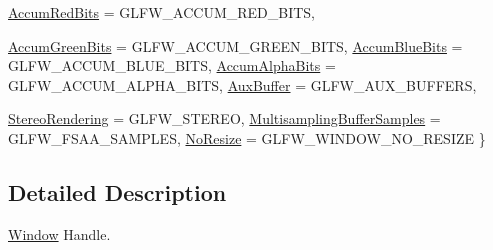 \begin{DoxyCompactItemize}
\hyperlink{namespace_f2_c_1_1_window_property_a89ec69d0a86f9d0063dfb69a3ebf3fbeafa16176fe0f3b5e528dbf1feb3d497ae}{AccumRedBits} =  GLFW\_\-ACCUM\_\-RED\_\-BITS, 
\par
\hyperlink{namespace_f2_c_1_1_window_property_a89ec69d0a86f9d0063dfb69a3ebf3fbea6e19e47f84eee541f96722fa7d0463ed}{AccumGreenBits} =  GLFW\_\-ACCUM\_\-GREEN\_\-BITS, 
\hyperlink{namespace_f2_c_1_1_window_property_a89ec69d0a86f9d0063dfb69a3ebf3fbea97b2ba20eac0c20a059383ce37f80d6b}{AccumBlueBits} =  GLFW\_\-ACCUM\_\-BLUE\_\-BITS, 
\hyperlink{namespace_f2_c_1_1_window_property_a89ec69d0a86f9d0063dfb69a3ebf3fbea8b9cf8f02ecf3600e1acbef746d18b22}{AccumAlphaBits} =  GLFW\_\-ACCUM\_\-ALPHA\_\-BITS, 
\hyperlink{namespace_f2_c_1_1_window_property_a89ec69d0a86f9d0063dfb69a3ebf3fbea88a5b2e774c2a1f6ae1e73147a5efb14}{AuxBuffer} =  GLFW\_\-AUX\_\-BUFFERS, 
\par
\hyperlink{namespace_f2_c_1_1_window_property_a89ec69d0a86f9d0063dfb69a3ebf3fbea4c44183de9d177c4983297940cdb3807}{StereoRendering} =  GLFW\_\-STEREO, 
\hyperlink{namespace_f2_c_1_1_window_property_a89ec69d0a86f9d0063dfb69a3ebf3fbeaf25fbd4a0c7fb8c62aeba61a1a4326f6}{MultisamplingBufferSamples} =  GLFW\_\-FSAA\_\-SAMPLES, 
\hyperlink{namespace_f2_c_1_1_window_property_a89ec69d0a86f9d0063dfb69a3ebf3fbea47495d245665347bbceb91f3c48f2fc9}{NoResize} =  GLFW\_\-WINDOW\_\-NO\_\-RESIZE
 \}
\end{DoxyCompactItemize}


\subsection{Detailed Description}
\hyperlink{class_f2_c_1_1_window}{Window} Handle. 


